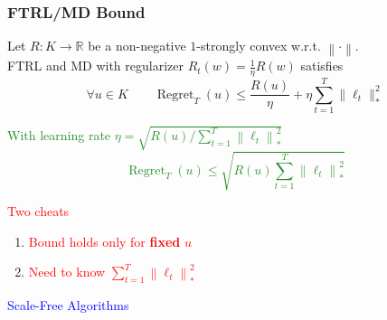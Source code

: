 \documentclass[usenames,dvipsnames]{beamer}
\DeclareMathOperator{\Regret}{Regret}
\newcommand{\R}{\mathbb{R}}
\newcommand{\norm}[1]{\left\|#1\right\|}
\begin{document}
\begin{frame}
\frametitle{FTRL/MD Bound}

\begin{theorem}[\textcolor{Blue}{CBL'06, SS'11}]
Let $R:K \to \R$ be a non-negative $1$-strongly convex w.r.t. $\norm{\cdot}$. \\
FTRL and MD with regularizer $R_t(w) = \frac{1}{\eta} R(w)$ satisfies
$$
\forall u \in K \qquad  \Regret_T(u) \le \frac{R(u)}{\eta} + \eta \sum_{t=1}^T \|\ell_t\|_*^2
$$
\end{theorem}

\pause
\textcolor{ForestGreen}{
With learning rate $\eta = \sqrt{R(u)/\sum_{t=1}^T \norm{\ell_t}_*^2}$
$$
\Regret_T(u) \le \sqrt{R(u) \sum_{t=1}^T \norm{\ell_t}_*^2}
$$}

\pause
\textcolor{red}{Two cheats}
\begin{enumerate}
\item \textcolor{red}{Bound holds only for \textbf{fixed} $u$}
\item \textcolor{red}{Need to know $\sum_{t=1}^T \norm{\ell_t}_*^2$}
\end{enumerate}

\end{frame}

\begin{frame}
\centering
\Huge
\textcolor{Blue}{Scale-Free Algorithms}
\end{frame}
\end{document}
